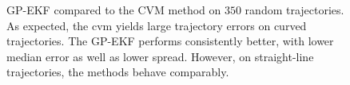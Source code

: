 \begin{figure}
    \centering
    \caption{GP-EKF compared to the CVM method on $350$ random trajectories. As expected, the \acrshort{cvm} yields large trajectory errors on curved trajectories. The GP-EKF performs consistently better, with lower median error as well as lower spread. However, on straight-line trajectories, the methods behave comparably.}
    \label{fig:stats_direct_gp_vs_ekf_cvm}
\end{figure}

